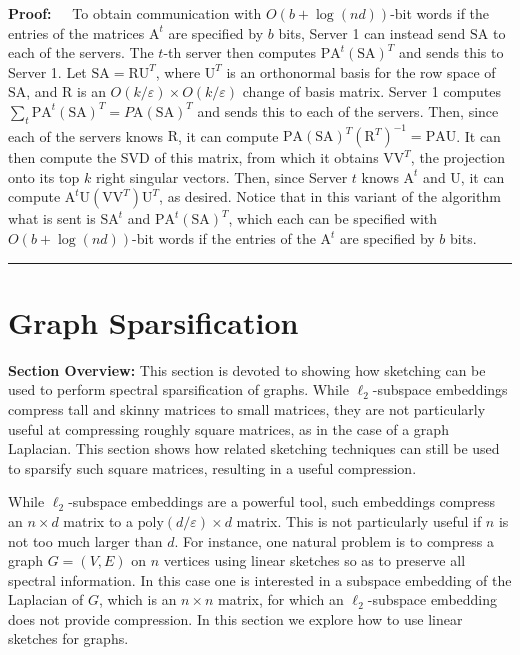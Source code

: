 \documentclass[11pt]{article}
\newenvironment{proof}{\begin{trivlist} \item {\bf Proof:~~}}
  {\qed\end{trivlist}}
\newcommand{\mat}[1]{{\ensuremath{\bm{\mathrm{#1}}}}}
\def\matA{\mat{A}}
\def\matP{\mat{P}}
\def\matR{\mat{R}}
\def\matS{\mat{S}}
\def\matU{\mat{U}}
\def\matV{\mat{V}}
\def\qed{\hfill\rule{2mm}{2mm}}
\newcommand{\eps}{\varepsilon}
\newcommand{\poly}{{\mathrm{poly}}}
\begin{document}
\begin{proof}
To obtain communication with $O(b + \log(nd))$-bit words if the entries of the matrices $\matA^t$ are specified by $b$ bits, Server 1 can
instead send $\matS\matA$ to each of the servers. The $t$-th server then computes $\matP\matA^t (\matS\matA)^T$ and sends this to Server 1.
Let $\matS\matA = \matR\matU^T$, where $\matU^T$ is an orthonormal
basis for the row space of $\matS\matA$, and $\matR$ is an $O(k/\eps) \times O(k/\eps)$ change of basis matrix.
Server 1 computes 
$\sum_t \matP\matA^t (\matS\matA)^T = P\matA(\matS\matA)^T$ and sends this to each of the servers. Then, since each of the servers
knows $\matR$, it can compute $\matP\matA(\matS\matA)^T (\matR^T)^{-1} = \matP\matA\matU$. 
It can then compute the SVD of this matrix, from which it obtains
$\matV\matV^T$, the projection onto its top $k$ right singular vectors. Then, since Server $t$ knows $\matA^t$ and $\matU$, it can compute
$\matA^t \matU(\matV\matV^T)\matU^T$, as desired. Notice that in this variant of the algorithm what is sent is 
$\matS\matA^t$ and $\matP\matA^t(\matS\matA)^T$, which
each can be specified with $O(b + \log(nd))$-bit words if the entries of the $\matA^t$ are specified by $b$ bits.
\end{proof}

\section{Graph Sparsification}
{\bf Section Overview:} This section is devoted to showing how sketching can be used to perform spectral sparsification of graphs. While $\ell_2$-subspace embeddings compress tall and skinny matrices to small matrices, they are not particularly useful at compressing roughly square matrices, as in the case of a graph Laplacian. This section shows how related sketching techniques can still be used to sparsify such square matrices, resulting in a useful compression.

While $\ell_2$-subspace embeddings are a powerful tool, such embeddings compress an $n \times d$ 
matrix to a $\poly(d/\eps) \times d$ matrix. 
This is not particularly useful if $n$ is not too much larger than $d$. For instance, one natural problem is to compress
a graph $G = (V, E)$ on $n$ vertices using linear sketches so as to preserve all spectral information. In this case one is interested in a subspace embedding of the Laplacian of $G$, which is an $n \times n$ matrix, for which an $\ell_2$-subspace embedding does not provide compression.  
In this section we explore
how to use linear sketches for graphs. 
\end{document}
